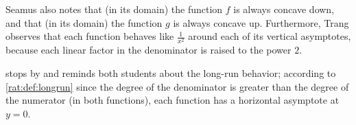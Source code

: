 \begin{pccexample}
		 Seamus also notes that (in its domain) the function $f$ is always concave down, and
		 that (in its domain) the function $g$ is always concave up. Furthermore, Trang
		 observes that each function behaves like $\frac{1}{x^2}$ around each of its vertical
		 asymptotes, because each linear factor in the denominator is raised to the power $2$.

		  stops by and reminds both students about the long-run behavior; according
		 to \cref{rat:def:longrun} since the degree of the denominator is greater than the
		 degree of the numerator (in both functions), each function has a horizontal asymptote
		 at $y=0$.
	 \end{pccexample}


	 \investigation*{}
